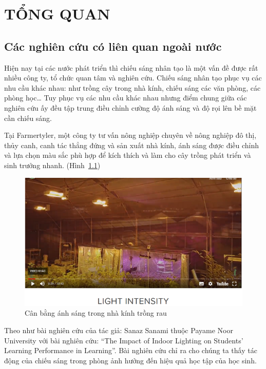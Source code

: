 \chapter{TỔNG QUAN}
\section{Các nghiên cứu có liên quan ngoài nước}
Hiện nay tại các nước phát triển thì chiếu sáng nhân tạo là một vấn đề được rất nhiều công ty, tổ chức quan tâm và nghiên cứu. Chiếu sáng nhân tạo phục vụ các nhu cầu khác nhau: như trồng cây trong nhà kính, chiếu sáng các văn phòng, các phòng học… Tuy phục vụ các nhu cầu khác nhau nhưng điểm chung giữa các nghiên cứu ấy đều tập trung điều chỉnh cường độ ánh sáng và độ rọi lên bề mặt cần chiếu sáng.

Tại Farmertyler, một công ty tư vấn nông nghiệp chuyên về nông nghiệp đô thị, thủy canh, canh tác thẳng đứng và sản xuất nhà kính, ánh sáng được điều chỉnh và lựa chọn màu sắc phù hợp để kích thích và làm cho cây trồng phát triển và sinh trưởng nhanh. (Hình~\ref{fig:nhakinhtrongrau})
\begin{center}
    \begin{figure}[!htp]
    \begin{center}
     \includegraphics[scale=0.9]{Chapters/Chapter2/ImagesChapter2/Nhakinhtrongrau}
    \end{center}
    \caption{Cân bằng ánh sáng trong nhà kính trồng rau}
    \label{fig:nhakinhtrongrau}
    \end{figure}
\end{center}

Theo như bài nghiên cứu của tác giả: Sanaz Sanami thuộc Payame Noor University với bài nghiên cứu: “The Impact of Indoor Lighting on Students’ Learning Performance in Learning”. Bài nghiên cứu chỉ ra cho chúng ta thấy tác động của chiếu sáng trong phòng ảnh hưởng đến hiệu quả học tập của học sinh.

